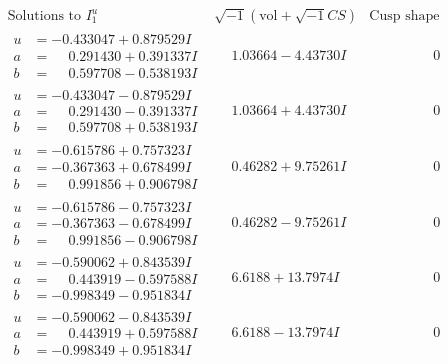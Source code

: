 \documentclass[1p]{elsarticle_modified}
\theoremstyle{definition}
\newcommand{\I}{\sqrt{-1}}
\begin{document}
$$\begin{array}{c|c|c}  
\text{Solutions to }I^u_{1}& \I (\text{vol} + \sqrt{-1}CS) & \text{Cusp shape}\\
 \hline 
\begin{aligned}
u &= -0.433047 + 0.879529 I \\
a &= \phantom{-}0.291430 + 0.391337 I \\
b &= \phantom{-}0.597708 - 0.538193 I\end{aligned}
 & \phantom{-}1.03664 - 4.43730 I & \phantom{-0.000000 } 0 \\ \hline\begin{aligned}
u &= -0.433047 - 0.879529 I \\
a &= \phantom{-}0.291430 - 0.391337 I \\
b &= \phantom{-}0.597708 + 0.538193 I\end{aligned}
 & \phantom{-}1.03664 + 4.43730 I & \phantom{-0.000000 } 0 \\ \hline\begin{aligned}
u &= -0.615786 + 0.757323 I \\
a &= -0.367363 + 0.678499 I \\
b &= \phantom{-}0.991856 + 0.906798 I\end{aligned}
 & \phantom{-}0.46282 + 9.75261 I & \phantom{-0.000000 } 0 \\ \hline\begin{aligned}
u &= -0.615786 - 0.757323 I \\
a &= -0.367363 - 0.678499 I \\
b &= \phantom{-}0.991856 - 0.906798 I\end{aligned}
 & \phantom{-}0.46282 - 9.75261 I & \phantom{-0.000000 } 0 \\ \hline\begin{aligned}
u &= -0.590062 + 0.843539 I \\
a &= \phantom{-}0.443919 - 0.597588 I \\
b &= -0.998349 - 0.951834 I\end{aligned}
 & \phantom{-}6.6188 + 13.7974 I & \phantom{-0.000000 } 0 \\ \hline\begin{aligned}
u &= -0.590062 - 0.843539 I \\
a &= \phantom{-}0.443919 + 0.597588 I \\
b &= -0.998349 + 0.951834 I\end{aligned}
 & \phantom{-}6.6188 - 13.7974 I & \phantom{-0.000000 } 0 \\ \hline\begin{aligned}

\end{aligned}
\end{array}$$
\end{document}
